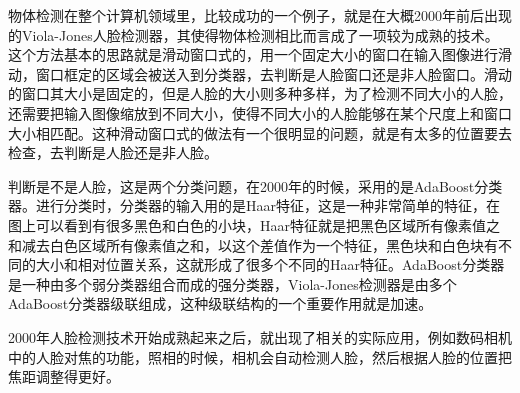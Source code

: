 物体检测在整个计算机领域里，比较成功的一个例子，就是在大概2000年前后出现的Viola-Jones人脸检测器，其使得物体检测相比而言成了一项较为成熟的技术。这个方法基本的思路就是滑动窗口式的，用一个固定大小的窗口在输入图像进行滑动，窗口框定的区域会被送入到分类器，去判断是人脸窗口还是非人脸窗口。滑动的窗口其大小是固定的，但是人脸的大小则多种多样，为了检测不同大小的人脸，还需要把输入图像缩放到不同大小，使得不同大小的人脸能够在某个尺度上和窗口大小相匹配。这种滑动窗口式的做法有一个很明显的问题，就是有太多的位置要去检查，去判断是人脸还是非人脸。

判断是不是人脸，这是两个分类问题，在2000年的时候，采用的是AdaBoost分类器。进行分类时，分类器的输入用的是Haar特征，这是一种非常简单的特征，在图上可以看到有很多黑色和白色的小块，Haar特征就是把黑色区域所有像素值之和减去白色区域所有像素值之和，以这个差值作为一个特征，黑色块和白色块有不同的大小和相对位置关系，这就形成了很多个不同的Haar特征。AdaBoost分类器是一种由多个弱分类器组合而成的强分类器，Viola-Jones检测器是由多个AdaBoost分类器级联组成，这种级联结构的一个重要作用就是加速。

2000年人脸检测技术开始成熟起来之后，就出现了相关的实际应用，例如数码相机中的人脸对焦的功能，照相的时候，相机会自动检测人脸，然后根据人脸的位置把焦距调整得更好。